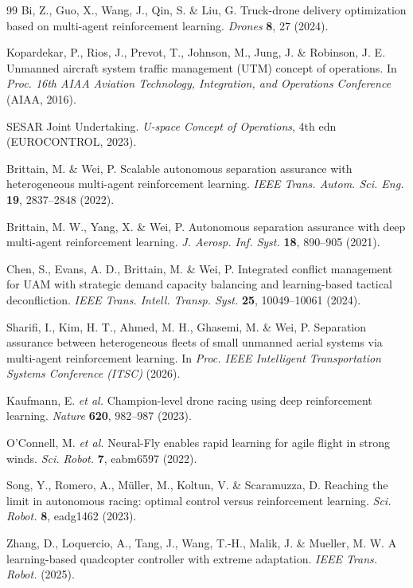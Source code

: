 \begin{thebibliography}{99}
 Bi, Z., Guo, X., Wang, J., Qin, S. \& Liu, G. Truck-drone delivery optimization based on multi-agent reinforcement learning. \textit{Drones} \textbf{8}, 27 (2024).

 Kopardekar, P., Rios, J., Prevot, T., Johnson, M., Jung, J. \& Robinson, J. E. Unmanned aircraft system traffic management (UTM) concept of operations. In \textit{Proc. 16th AIAA Aviation Technology, Integration, and Operations Conference} (AIAA, 2016).

 SESAR Joint Undertaking. \textit{U-space Concept of Operations}, 4th edn (EUROCONTROL, 2023).

 Brittain, M. \& Wei, P. Scalable autonomous separation assurance with heterogeneous multi-agent reinforcement learning. \textit{IEEE Trans. Autom. Sci. Eng.} \textbf{19}, 2837--2848 (2022).

 Brittain, M. W., Yang, X. \& Wei, P. Autonomous separation assurance with deep multi-agent reinforcement learning. \textit{J. Aerosp. Inf. Syst.} \textbf{18}, 890--905 (2021).

 Chen, S., Evans, A. D., Brittain, M. \& Wei, P. Integrated conflict management for UAM with strategic demand capacity balancing and learning-based tactical deconfliction. \textit{IEEE Trans. Intell. Transp. Syst.} \textbf{25}, 10049--10061 (2024).

 Sharifi, I., Kim, H. T., Ahmed, M. H., Ghasemi, M. \& Wei, P. Separation assurance between heterogeneous fleets of small unmanned aerial systems via multi-agent reinforcement learning. In \textit{Proc. IEEE Intelligent Transportation Systems Conference (ITSC)} (2026).

 Kaufmann, E. \textit{et al.} Champion-level drone racing using deep reinforcement learning. \textit{Nature} \textbf{620}, 982--987 (2023).

 O'Connell, M. \textit{et al.} Neural-Fly enables rapid learning for agile flight in strong winds. \textit{Sci. Robot.} \textbf{7}, eabm6597 (2022).

 Song, Y., Romero, A., M\"uller, M., Koltun, V. \& Scaramuzza, D. Reaching the limit in autonomous racing: optimal control versus reinforcement learning. \textit{Sci. Robot.} \textbf{8}, eadg1462 (2023).

 Zhang, D., Loquercio, A., Tang, J., Wang, T.-H., Malik, J. \& Mueller, M. W. A learning-based quadcopter controller with extreme adaptation. \textit{IEEE Trans. Robot.} (2025).


\end{thebibliography}
